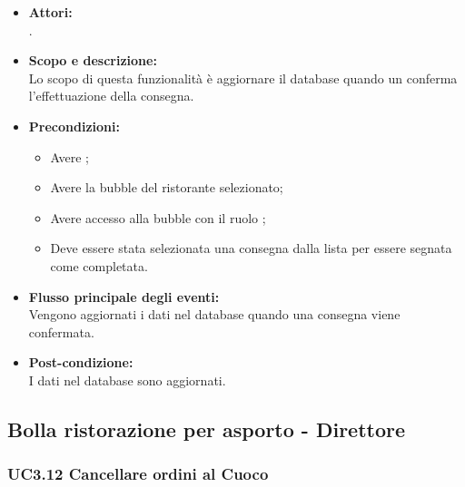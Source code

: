 \begin{itemize}
	\item \textbf{Attori:}
	\\.
	\item \textbf{Scopo e descrizione:} 
	\\Lo scopo di questa funzionalità è aggiornare il database quando un  conferma l’effettuazione della consegna.
	\item \textbf{Precondizioni:}
	\begin{itemize}
		\item Avere ;
		\item Avere la bubble del ristorante selezionato;
		\item Avere accesso alla bubble con il ruolo ;
		\item Deve essere stata selezionata una consegna dalla lista per essere segnata come completata.
	\end{itemize}
	\item \textbf{Flusso principale degli eventi:}
	\\Vengono aggiornati i dati nel database quando una consegna viene confermata.
	\item \textbf{Post-condizione:}
	\\I dati nel database sono aggiornati.
\end{itemize}

\subsection{Bolla ristorazione per asporto - Direttore}

\subsubsection{UC3.12 Cancellare ordini al Cuoco} \label{UC3.12}


